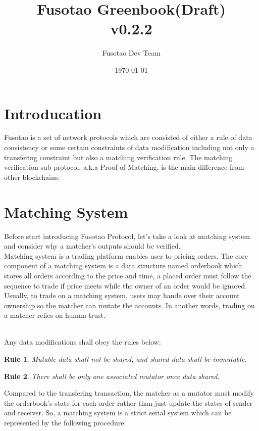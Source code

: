 \documentclass[a4paper,12pt]{article}
\author{Fusotao Dev Team}
\date{\today}
\title{Fusotao Greenbook(Draft)\\\medskip
\large v0.2.2}
\begin{document}
\maketitle
\clearpage

\section{Introducation}
\label{sec:org5e9fe25}
Fusotao is a set of network protocols which are consisted of either a rule of data consistency or some certain constraints of data modification including not only a transfering constraint but also a matching verification rule. The matching verification sub-protocol, a.k.a Proof of Matching, is the main difference from other blockchains.\\

\section{Matching System}
\label{sec:org29a156e}
Before start introducing Fusotao Protocol, let's take a look at matching system and consider why a matcher's outputs should be verified.\\
Matching system is a trading platform enables user to pricing orders. The core component of a matching system is a data structure named orderbook which stores all orders according to the price and time, a placed order must follow the sequence to trade if price meets while the owner of an order would be ignored. Usually, to trade on a matching system, users may hande over their account ownership so the matcher can mutate the accounts. In another words, trading on a matcher relies on human trust.\\
\newtheorem{theorem}{Rule}\\
Any data modifications shall obey the rules below:\\
\begin{theorem}
Mutable data shall not be shared, and shared data shall be immutable.
\end{theorem}
\begin{theorem}
There shall be only one associated mutator once data shared.
\end{theorem}
Compared to the transfering transaction, the matcher as a mutator must modify the orderbook's state for each order rather than just update the states of sender and receiver. So, a matching system is a strict serial system which can be represented by the following procedure:\\
\end{document}
